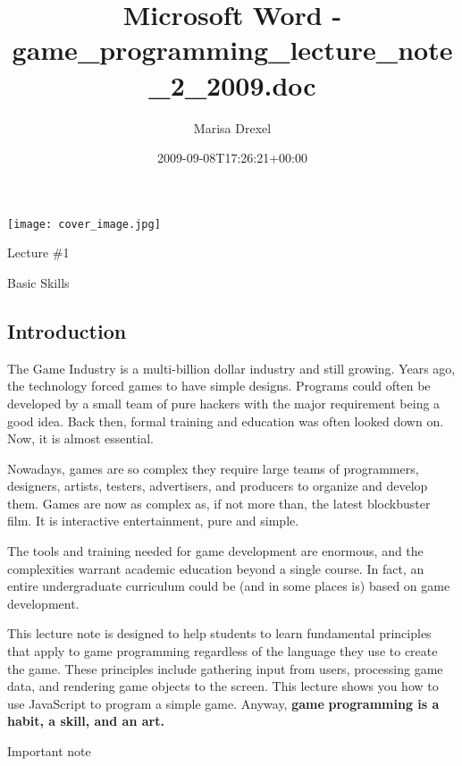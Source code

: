 \documentclass[
]{article}
\title{Microsoft Word - game\_programming\_lecture\_note\_2\_2009.doc}
\author{Marisa Drexel}
\date{2009-09-08T17:26:21+00:00}
\begin{document}
\maketitle

\texttt{[image: cover\_image.jpg]}

\protect\hypertarget{titlepage.xhtml}{}{}

\protect\hypertarget{index_split_000.html}{}{}

\protect\hypertarget{index_split_000.htmlux5cux23p1}{}{}

Lecture \#1

Basic Skills

\protect\hypertarget{index_split_001.html}{}{}

\hypertarget{index_split_001.htmlux5cux23calibre_pb_0}{%
\subsection{Introduction}\label{index_split_001.htmlux5cux23calibre_pb_0}}

The Game Industry is a multi-billion dollar industry and still growing.
Years ago, the technology forced games to have simple designs. Programs
could often be developed by a small team of pure hackers with the major
requirement being a good idea. Back then, formal training and education
was often looked down on. Now, it is almost essential.

Nowadays, games are so complex they require large teams of programmers,
designers, artists, testers, advertisers, and producers to organize and
develop them. Games are now as complex as, if not more than, the latest
blockbuster film. It is interactive entertainment, pure and simple.

The tools and training needed for game development are enormous, and the
complexities warrant academic education beyond a single course. In fact,
an entire undergraduate curriculum could be (and in some places is)
based on game development.

This lecture note is designed to help students to learn fundamental
principles that apply to game programming regardless of the language
they use to create the game. These principles include gathering input
from users, processing game data, and rendering game objects to the
screen. This lecture shows you how to use JavaScript to program a simple
game. Anyway, \textbf{game} \textbf{programming is a habit, a skill, and
an art.}

Important note
\end{document}
